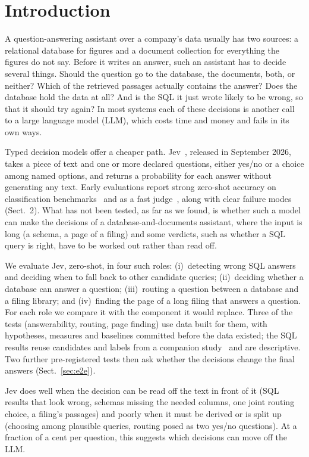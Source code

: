 \documentclass[runningheads,a4paper]{llncs}
\begin{document}
\section{Introduction}
A question-answering assistant over a company's data usually has two sources: a relational database for figures
and a document collection for everything the figures do not say. Before it writes an answer, such an assistant has
to decide several things. Should the question go to the database, the documents, both, or neither? Which of the
retrieved passages actually contains the answer? Does the database hold the data at all? And is the SQL it just
wrote likely to be wrong, so that it should try again? In most systems each of these decisions is another call to a
large language model (LLM), which costs time and money and fails in its own ways.

Typed decision models offer a cheaper path. Jev~\cite{typesafe2026jev}, released in September 2026, takes a piece of
text and one or more declared questions, either yes/no or a choice among named options, and returns a probability
for each answer without generating any text. Early evaluations report strong zero-shot accuracy on classification benchmarks~\cite{deusser2026jev} and as a fast
judge~\cite{li2026jevjudge}, along with clear failure modes (Sect.~2). What has not been tested, as far as we found, is whether such a
model can make the decisions of a database-and-documents assistant, where the input is long (a schema, a page of a
filing) and some verdicts, such as whether a SQL query is right, have to be worked out rather than read off.

We evaluate Jev, zero-shot, in four such roles: (i)~detecting wrong SQL answers and deciding when to fall back to
other candidate queries; (ii)~deciding whether a database can answer a question; (iii)~routing a question between
a database and a filing library; and (iv)~finding the page of a long filing that answers a question. For each role
we compare it with the component it would replace. Three of the tests (answerability, routing, page finding) use
data built for them, with hypotheses, measures and baselines committed before the data existed; the SQL results
reuse candidates and labels from a companion study~\cite{companion2026warnings} and are descriptive. Two further
pre-registered tests then ask whether the decisions change the final answers (Sect.~\ref{sec:e2e}).

Jev does well when the decision can be read off the text in front of it (SQL results that look wrong, schemas
missing the needed columns, one joint routing choice, a filing's passages) and poorly when it must be derived or is
split up (choosing among plausible queries, routing posed as two yes/no questions). At a fraction of a cent per
question, this suggests which decisions can move off the LLM.
\end{document}
